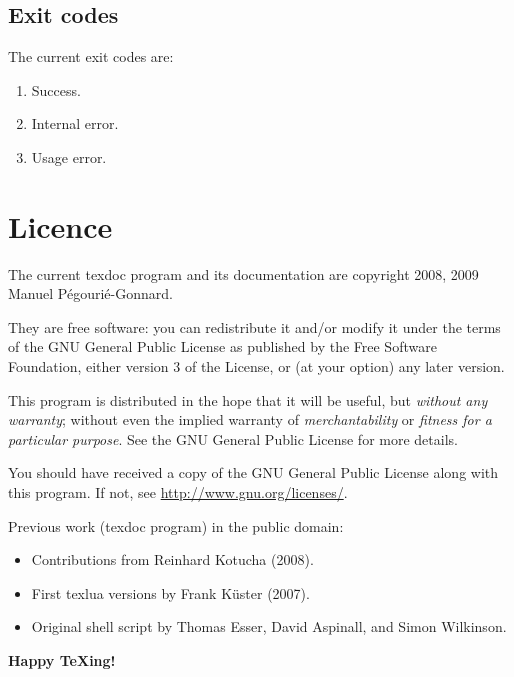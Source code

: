 \documentclass[a4paper, oneside]{scrartcl}
\newcommand\texdoc{texdoc\xspace}
\begin{document}
\subsection{Exit codes}\label{ss-exit}

The current exit codes are:
\begin{enumerate}[start=0]
  \item Success.
  \item Internal error.
  \item Usage error.
\end{enumerate}

\section{Licence}\label{s-licence}

The current \texdoc program and its documentation are copyright 2008, 2009
Manuel Pégourié-Gonnard.

They are free software: you can redistribute it and/or modify it under the
terms of the GNU General Public License as published by the Free Software
Foundation, either version 3 of the License, or (at your option) any later
version.

This program is distributed in the hope that it will be useful, but
\emph{without any warranty}; without even the implied warranty of
\emph{merchantability} or \emph{fitness for a particular purpose}.  See the
GNU General Public License for more details.

You should have received a copy of the GNU General Public License along with
this program.  If not, see \url{http://www.gnu.org/licenses/}.

\bigskip

Previous work (texdoc program) in the public domain:
\begin{itemize}
  \item Contributions from Reinhard Kotucha (2008).
  \item First texlua versions by Frank Küster (2007).
  \item Original shell script by Thomas Esser, David Aspinall, and Simon
	Wilkinson.
\end{itemize}

\bigskip
\begin{center}\Large\rmfamily\bfseries
  Happy \TeX{}ing!
\end{center}
\end{document}
